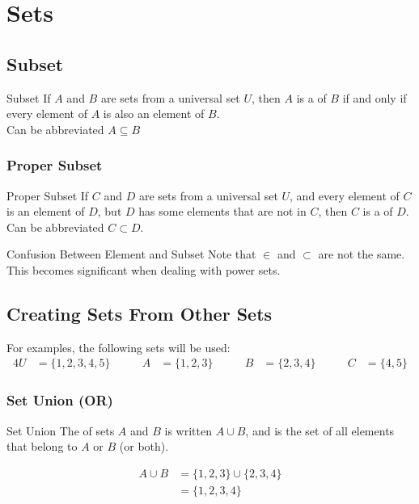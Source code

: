 \documentclass[../notes.tex]{subfiles}
\begin{document}
	\ifSubfilesClassLoaded{\setcounter{chapter}{2}}{}
	\chapter{Sets}
		\section{Subset}
			\begin{definition}{Subset}
				If $A$ and $B$ are sets from a universal set $U$, then $A$ is a  of $B$ if and only if every element of $A$ is also an element of $B$.\\
				Can be abbreviated $A \subseteq B$
			\end{definition}
			\subsection{Proper Subset}
				\begin{definition}{Proper Subset}
					If $C$ and $D$ are sets from a universal set $U$, and every element of $C$ is an element of $D$, but $D$ has some elements that are not in $C$, then $C$ is a  of $D$.\\
					Can be abbreviated $C \subset D$.
				\end{definition}
				\begin{sidenote}{Confusion Between Element and Subset}
					Note that $\in$ and $\subset$ are not the same. This becomes significant when dealing with power sets.
				\end{sidenote}
		\pagebreak
		\section{Creating Sets From Other Sets}
			For examples, the following sets will be used:
			\begin{alignat*}{4}
				U &= \{1, 2, 3, 4, 5\}\qquad & A &= \{1, 2, 3\} \qquad & B &= \{2, 3, 4\} \qquad & C &= \{4, 5\}
			\end{alignat*}

			\subsection[Set Union]{Set Union (OR)}
				\begin{definition}{Set Union}
					The  of sets $A$ and $B$ is written $A \cup B$, and is the set of all elements that belong to $A$ or $B$ (or both).
				\end{definition}
				\nopagebreak
				\begin{center}
					\begin{venntwo}[][$A \cup B = \bigl\{x \mid x \in A$ or $x \in B\bigr\}$]
						\fillA
						\fillB
					\end{venntwo}
				\end{center}
				\nopagebreak
				\begin{example} \moveup
					\begin{align*}
						A \cup B &= \{1, 2, 3\} \cup \{2, 3, 4\}\\
						&= \{1, 2, 3, 4\}
					\end{align*}
				\end{example}
\end{document}
